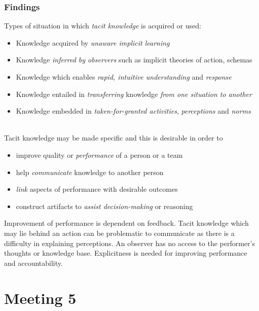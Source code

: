\documentclass[12pt,a4paper]{article}
\begin{document}
    \subsubsection{Findings}
      Types of situation in which \emph{tacit knowledge} is acquired or used:
      \begin{itemize}
        \item Knowledge acquired by \emph{unaware implicit learning}
        \item Knowledge \emph{inferred by observers} such as implicit theories of action, schemas
        \item Knowledge which enables \emph{rapid, intuitive understanding} and \emph{response}
        \item Knowledge entailed in \emph{transferring} knowledge \emph{from one situation to another}
        \item Knowledge embedded in \emph{taken-for-granted activities}, \emph{perceptions} and \emph{norms}
      \end{itemize}
      \\
      Tacit knowledge may be made specific and this is desirable in order to
      \begin{itemize}
        \item improve quality or \emph{performance} of a person or a team
        \item help \emph{communicate} knowledge to another person
        \item \emph{link} aspects of performance with desirable outcomes
        \item construct artifacts to \emph{assist decision-making} or reasoning
      \end{itemize}
      Improvement of performance is dependent on feedback. Tacit knowledge which may lie behind an action can be problematic to communicate as there is a difficulty in explaining perceptions. An observer has no access to the performer's thoughts or knowledge base. Explicitness is needed for improving performance and accountability.



\section{Meeting 5} %
\label{sec:Meeting 5}
\end{document}
